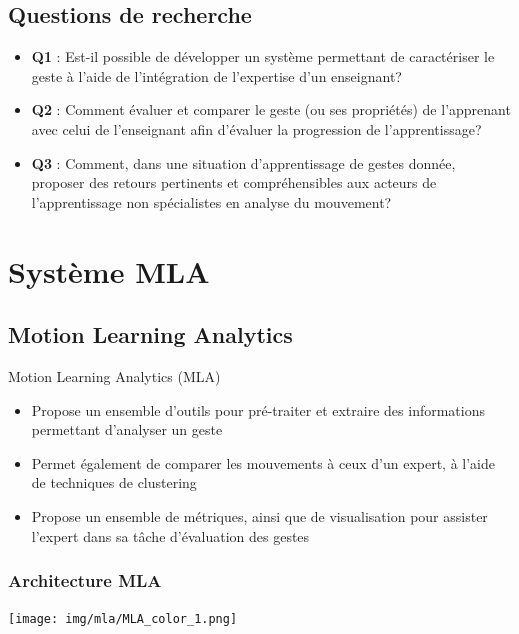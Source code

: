 \documentclass[svgnames]{beamer}
\begin{document}
	\subsection{Questions de recherche}
	\begin{frame}{\subsecname}
		\begin{itemize}[label=$-$]
			\item \textbf{Q1} : Est-il possible de développer un système permettant de caractériser le geste à l'aide de l'intégration de l'expertise d'un enseignant?
			\item \textbf{Q2} : Comment évaluer et comparer le geste (ou ses propriétés) de l'apprenant avec celui de l'enseignant afin d'évaluer la progression de l'apprentissage?
			\item \textbf{Q3} : Comment, dans une situation d'apprentissage de gestes donnée, proposer des retours pertinents et compréhensibles aux acteurs de l'apprentissage non spécialistes en analyse du mouvement?
		\end{itemize}
	\end{frame}

	\section{Système MLA}
	\subsection{Motion Learning Analytics}
	\begin{frame}{\subsecname}
		\begin{block}{Motion Learning Analytics (MLA)}
			\begin{itemize}[label=$\bullet$]
				\item Propose un ensemble d'outils pour pré-traiter et extraire des informations permettant d'analyser un geste
				\item Permet également de comparer les mouvements à ceux d'un expert, à l'aide de techniques de clustering
				\item Propose un ensemble de métriques, ainsi que de visualisation pour assister l'expert dans sa tâche d'évaluation des gestes
			\end{itemize}
		\end{block}
	\end{frame}
	
	\subsubsection{Architecture MLA}
	\begin{frame}{\subsubsecname}
	\centering
		\texttt{[image: img/mla/MLA\_color\_1.png]}
	\end{frame}
\end{document}
